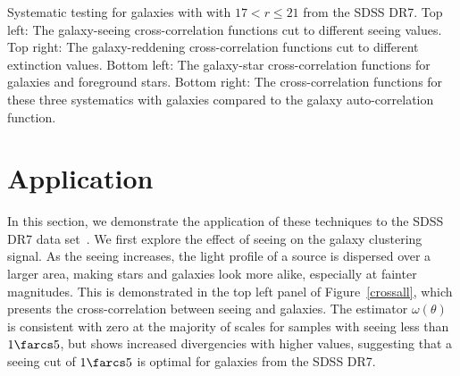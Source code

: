 {Systematic testing for galaxies with  with  $17 < r \le 21$ from the SDSS DR7. Top left: The galaxy-seeing cross-correlation functions cut to different seeing values. Top right: The galaxy-reddening cross-correlation functions cut to different extinction values. Bottom left: The galaxy-star cross-correlation functions for galaxies and foreground stars. Bottom right: The cross-correlation functions for these three systematics with galaxies compared to the galaxy auto-correlation function.}

\section{Application}
In this section, we demonstrate the application of these techniques to the SDSS DR7 data set~\citep{sdssdr7}. We first explore the effect of seeing on the galaxy clustering signal. As the seeing increases, the light profile of a source is dispersed over a larger area, making stars and galaxies look more alike, especially at fainter magnitudes. This is demonstrated in the top left panel of Figure~\ref{crossall}, which presents the cross-correlation between seeing and galaxies. The estimator $\omega(\theta)$ is consistent with zero at the majority of scales for samples with seeing less than $1\farcs5$, but shows increased divergencies with higher values, suggesting that a seeing cut of $1\farcs5$ is optimal for galaxies from the SDSS DR7.

